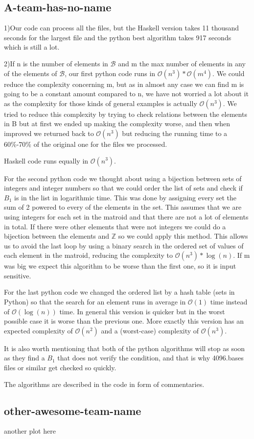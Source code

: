 \documentclass[11pt]{amsart}
\begin{document}
\subsection{A-team-has-no-name}

1)Our code can process all the files, but the Haskell version takes 11 thousand seconds for the largest file and the python best algorithm takes 917 seconds which is still a lot.

2)If n is the number of elements in $\mathcal{B}$ and m the max number of elements in any of the elements of $\mathcal{B}$, our first python code runs in $\mathcal{O}(n^3)*\mathcal{O}(m^4)$.
We could reduce the complexity concerning m, but as in almost any case we can find m is going to be a constant amount compared to n, we have not worried a lot about it as the complexity for those kinds of general examples is actually $\mathcal{O}(n^3)$.
We tried to reduce this complexity by trying to check relations between the elements in B but at first we ended up making the complexity worse, and then when improved we returned back to $\mathcal{O}(n^3)$ but reducing the running time to a 60\%-70\% of the original one for the files we processed.

Haskell code runs equally in $\mathcal{O}(n^3)$.

For the second python code we thought about using a bijection between sets of integers and integer numbers so that we could order the list of sets and check if $B_1$ is in the list in logarithmic time.
This was done by assigning every set the sum of 2 powered to every of the elements in the set. 
This assumes that we are using integers for each set in the matroid and that there are not a lot of elements in total. If there were other elements that were not integers we could do a bijection between the elements and $\mathbb{Z}$ so we could apply this method.
This allows us to avoid the last loop by using a binary search in the ordered set of values of each element in the matroid, reducing the complexity to $\mathcal{O}(n^3)*\log(n)$. 
If m was big we expect this algorithm to be worse than the first one, so it is input sensitive. 

For the last python code we changed the ordered list by a hash table (sets in Python) so that the search for an element runs in average in $\mathcal{O}(1)$ time instead of $\mathcal{O}(\log(n))$ time.
In general this version is quicker but in the worst possible case it is worse than the previous one.
More exactly this version has an expected complexity of $\mathcal{O}(n^2)$ and a (worst-case) complexity of $\mathcal{O}(n^3)$.

It is also worth mentioning that both of the python algorithms will stop as soon as they find a $B_1$ that does not verify the condition, and that is why 4096.bases files or similar get checked so quickly.

The algorithms are described in the code in form of commentaries.


\subsection{other-awesome-team-name}

another plot here
\end{document}
